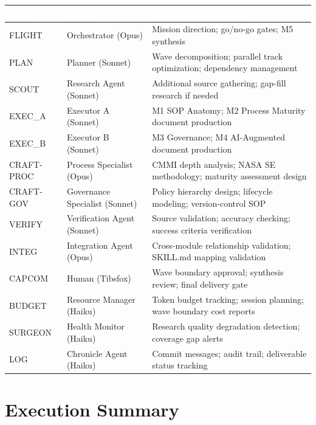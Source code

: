 \documentclass[11pt,letterpaper]{article}
\newcommand{\tableheader}[1]{\textbf{\sffamily\textcolor{white}{#1}}}
\begin{document}
\begin{center}
\begin{tabularx}{\textwidth}{L{2cm}L{3.5cm}X}
\toprule
{}
\tableheader{Role} & \tableheader{Agent} & \tableheader{Primary Responsibility} \\
\midrule
FLIGHT & Orchestrator (Opus) & Mission direction; go/no-go gates; M5 synthesis \\
PLAN & Planner (Sonnet) & Wave decomposition; parallel track optimization; dependency management \\
SCOUT & Research Agent (Sonnet) & Additional source gathering; gap-fill research if needed \\
EXEC\_A & Executor A (Sonnet) & M1 SOP Anatomy; M2 Process Maturity document production \\
EXEC\_B & Executor B (Sonnet) & M3 Governance; M4 AI-Augmented document production \\
CRAFT-PROC & Process Specialist (Opus) & CMMI depth analysis; NASA SE methodology; maturity assessment design \\
CRAFT-GOV & Governance Specialist (Sonnet) & Policy hierarchy design; lifecycle modeling; version-control SOP \\
VERIFY & Verification Agent (Sonnet) & Source validation; accuracy checking; success criteria verification \\
INTEG & Integration Agent (Opus) & Cross-module relationship validation; SKILL.md mapping validation \\
CAPCOM & Human (Tibsfox) & Wave boundary approval; synthesis review; final delivery gate \\
BUDGET & Resource Manager (Haiku) & Token budget tracking; session planning; wave boundary cost reports \\
SURGEON & Health Monitor (Haiku) & Research quality degradation detection; coverage gap alerts \\
LOG & Chronicle Agent (Haiku) & Commit messages; audit trail; deliverable status tracking \\
\bottomrule
\end{tabularx}
\end{center}

\section{Execution Summary}
\end{document}
